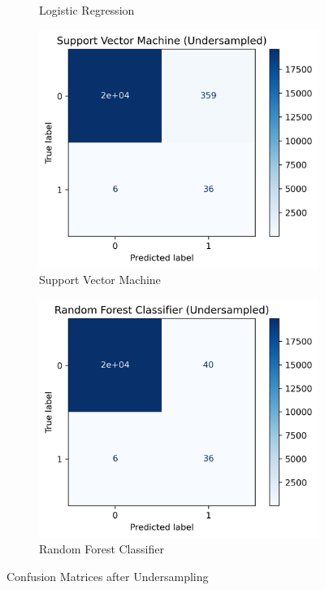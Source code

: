\documentclass[utf8x]{ctexart}
\begin{document}
\begin{figure}[htb]
\begin{subfigure}[b]{0.48\textwidth}
    \caption{Logistic Regression}
    \label{fig:u2}
  \end{subfigure}
  \begin{subfigure}[b]{0.48\textwidth}
    \centering
    \includegraphics[width=\textwidth]{./images/svm_conf1_u.png}
    \caption{Support Vector Machine}
    \label{fig:u3}
  \end{subfigure}
  \begin{subfigure}[b]{0.48\textwidth}
    \centering
    \includegraphics[width=\textwidth]{./images/rfc_conf1_u.png}
    \caption{Random Forest Classifier}
    \label{fig:u4}
  \end{subfigure}
  \caption{Confusion Matrices after Undersampling}
  \label{fig:u_comp}
\end{figure}
\end{document}
